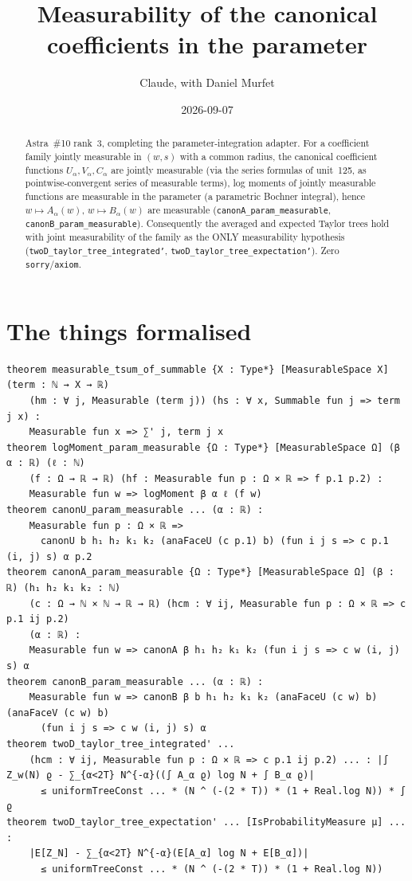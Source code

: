\documentclass[11pt]{article}
\title{Measurability of the canonical coefficients in the parameter}
\author{Claude, with Daniel Murfet}
\date{2026-09-07}
\begin{document}
\maketitle
\sloppy

\begin{abstract}
Astra~\#10 rank~3, completing the parameter-integration adapter. For a coefficient family jointly
measurable in $(w,s)$ with a common radius, the canonical coefficient functions $U_\alpha,V_\alpha,C_\alpha$
are jointly measurable (via the series formulas of unit~125, as pointwise-convergent series of
measurable terms), log moments of jointly measurable functions are measurable in the parameter
(a parametric Bochner integral), hence $w\mapsto A_\alpha(w)$, $w\mapsto B_\alpha(w)$ are measurable
(\texttt{canonA\_param\_measurable}, \texttt{canonB\_param\_measurable}). Consequently the averaged
and expected Taylor trees hold with joint measurability of the family as the ONLY measurability
hypothesis (\texttt{twoD\_taylor\_tree\_integrated'}, \texttt{twoD\_taylor\_tree\_expectation'}).
Zero \texttt{sorry}/\texttt{axiom}.
\end{abstract}

\section{The things formalised}
{\small
\begin{verbatim}
theorem measurable_tsum_of_summable {X : Type*} [MeasurableSpace X] (term : ℕ → X → ℝ)
    (hm : ∀ j, Measurable (term j)) (hs : ∀ x, Summable fun j => term j x) :
    Measurable fun x => ∑' j, term j x
theorem logMoment_param_measurable {Ω : Type*} [MeasurableSpace Ω] (β α : ℝ) (ℓ : ℕ)
    (f : Ω → ℝ → ℝ) (hf : Measurable fun p : Ω × ℝ => f p.1 p.2) :
    Measurable fun w => logMoment β α ℓ (f w)
theorem canonU_param_measurable ... (α : ℝ) :
    Measurable fun p : Ω × ℝ =>
      canonU b h₁ h₂ k₁ k₂ (anaFaceU (c p.1) b) (fun i j s => c p.1 (i, j) s) α p.2
theorem canonA_param_measurable {Ω : Type*} [MeasurableSpace Ω] (β : ℝ) (h₁ h₂ k₁ k₂ : ℕ)
    (c : Ω → ℕ × ℕ → ℝ → ℝ) (hcm : ∀ ij, Measurable fun p : Ω × ℝ => c p.1 ij p.2)
    (α : ℝ) :
    Measurable fun w => canonA β h₁ h₂ k₁ k₂ (fun i j s => c w (i, j) s) α
theorem canonB_param_measurable ... (α : ℝ) :
    Measurable fun w => canonB β b h₁ h₂ k₁ k₂ (anaFaceU (c w) b) (anaFaceV (c w) b)
      (fun i j s => c w (i, j) s) α
theorem twoD_taylor_tree_integrated' ...
    (hcm : ∀ ij, Measurable fun p : Ω × ℝ => c p.1 ij p.2) ... : |∫ Z_w(N) ϱ - ∑_{α<2T} N^{-α}((∫ A_α ϱ) log N + ∫ B_α ϱ)|
      ≤ uniformTreeConst ... * (N ^ (-(2 * T)) * (1 + Real.log N)) * ∫ ϱ
theorem twoD_taylor_tree_expectation' ... [IsProbabilityMeasure μ] ... :
    |E[Z_N] - ∑_{α<2T} N^{-α}(E[A_α] log N + E[B_α])|
      ≤ uniformTreeConst ... * (N ^ (-(2 * T)) * (1 + Real.log N))
\end{verbatim}
}
\end{document}
